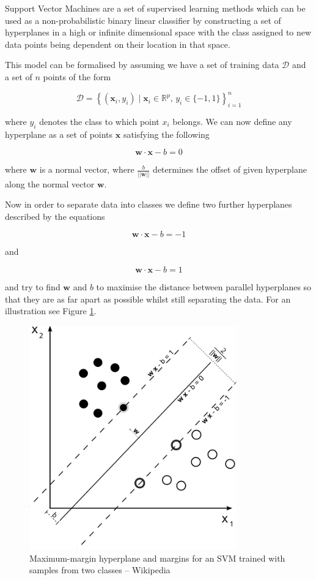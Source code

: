 Support Vector Machines are a set of supervised learning methods which can be used as a non-probabilistic binary linear classifier by constructing a set of hyperplanes in a high or infinite dimensional space with the class assigned to new data points being dependent on their location in that space.

This model can be formalised by assuming we have a set of training data $\mathcal{D}$ and a set of $n$ points of the form

$$\mathcal{D} = \left\{ (\mathbf{x}_i, y_i)\mid\mathbf{x}_i \in \mathbb{R}^p,\, y_i \in \{-1,1\}\right\}_{i=1}^n$$

where $y_i$ denotes the class to which point $x_i$ belongs. We can now define any hyperplane as a set of points $\mathbf{x}$ satisfying the following

$$\mathbf{w} \cdot \mathbf{x} - b = 0$$

where $\mathbf{w}$ is a normal vector, where $\frac{b}{||\mathbf{w}||}$ determines the offset of given hyperplane along the normal vector $\mathbf{w}$.

Now in order to separate data into classes we define two further hyperplanes described by the equations

$$\mathbf{w} \cdot \mathbf{x} - b = -1$$

and

$$\mathbf{w} \cdot \mathbf{x} - b = 1$$

and try to find $\mathbf{w}$ and $b$ to maximise the distance between parallel hyperplanes so that they are as far apart as possible whilst still separating the data. For an illustration see Figure \ref{fig:svm}.

\begin{figure}[htb]
  \begin{center}
    \includegraphics[width=0.8\textwidth]{svm.png}
    \caption{Maximum-margin hyperplane and margins for an SVM trained with samples from two classes -- Wikipedia}
    \label{fig:svm}
  \end{center}
\end{figure}


